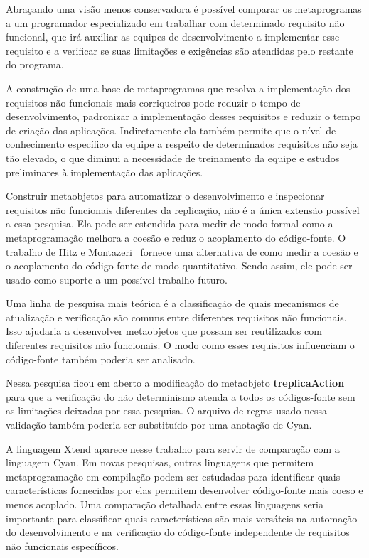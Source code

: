 Abraçando uma visão menos conservadora é possível comparar os metaprogramas a um programador especializado em trabalhar com determinado requisito não funcional, que irá auxiliar as equipes de desenvolvimento a implementar esse requisito e a verificar se suas limitações e exigências são atendidas pelo restante do programa.

A construção de uma base de metaprogramas que resolva a implementação dos requisitos não funcionais mais corriqueiros pode reduzir o tempo de desenvolvimento, padronizar a implementação desses requisitos e reduzir o tempo de criação das aplicações. Indiretamente ela também permite que o nível de conhecimento específico da equipe a respeito de determinados requisitos não seja tão elevado, o que diminui a necessidade de treinamento da equipe e estudos preliminares à implementação das aplicações.

Construir metaobjetos para automatizar o desenvolvimento e inspecionar requisitos não funcionais diferentes da replicação, não é a única extensão possível a essa pesquisa. Ela pode ser estendida para medir de modo formal como a metaprogramação melhora a coesão e reduz o acoplamento do código-fonte. O trabalho de Hitz e Montazeri~\cite{hitz1995measuring} fornece uma alternativa de como medir a coesão e o acoplamento do código-fonte de modo quantitativo. Sendo assim, ele pode ser usado como suporte a um possível trabalho futuro.

Uma linha de pesquisa mais teórica é a classificação de quais mecanismos de atualização e verificação são comuns entre diferentes requisitos não funcionais. Isso ajudaria a desenvolver metaobjetos que possam ser reutilizados com diferentes requisitos não funcionais. O modo como esses requisitos influenciam o código-fonte também poderia ser analisado.

Nessa pesquisa ficou em aberto a modificação do metaobjeto \textbf{treplicaAction} para que a verificação do não determinismo atenda a todos os códigos-fonte sem as limitações deixadas por essa pesquisa. O arquivo de regras usado nessa validação também poderia ser substituído por uma anotação de Cyan.

A linguagem Xtend aparece nesse trabalho para servir de comparação com a linguagem Cyan. Em novas pesquisas, outras linguagens que permitem metaprogramação em compilação podem ser estudadas para identificar quais características fornecidas por elas permitem desenvolver código-fonte mais coeso e menos acoplado. Uma comparação detalhada entre essas linguagens seria importante para classificar quais características são mais versáteis na automação do desenvolvimento e na verificação do código-fonte independente de requisitos não funcionais específicos.

